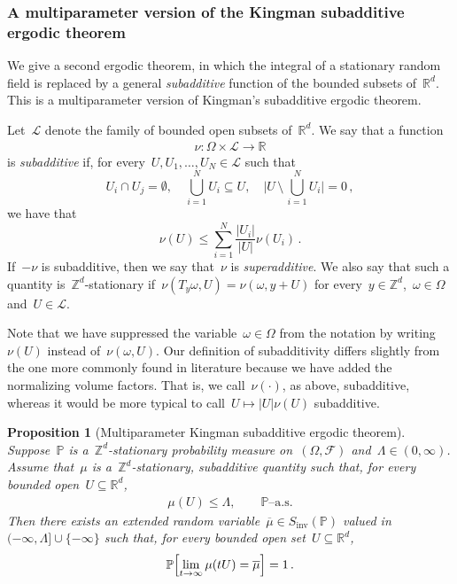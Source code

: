 \documentclass[11pt,twoside]{article} %
\numberwithin{equation}{section}
\newtheorem{proposition}[theorem]{Proposition}
\theoremstyle{definition}
\newcommand*{\R}{\ensuremath{\mathbb{R}}}
\newcommand*{\Zd}{\ensuremath{\mathbb{Z}^d}}
\newcommand*{\Rd}{\ensuremath{\mathbb{R}^d}}
\newcommand{\F}{\mathcal{F}}
\renewcommand{\P}{\mathbb{P}}
\begin{document}
\subsubsection{A multiparameter version of the Kingman subadditive ergodic theorem}

We give a second ergodic theorem, in which the integral of a stationary random field is replaced by a general \emph{subadditive} function of the bounded subsets of~$\Rd$. This is a multiparameter version of Kingman's subadditive ergodic theorem. 

\smallskip

Let~$\mathcal{L}$ denote the family of bounded open subsets of~$\Rd$. We say that a function
\begin{align*}
\nu:\Omega \times \mathcal{L} \to \R
\end{align*}
is \emph{subadditive} if, for every~$U, U_1,\ldots,U_N \in \mathcal{L}$ such that 
\begin{equation}
\label{e.U.partition}
U_i \cap U_j = \emptyset,  \quad
\bigcup_{i=1}^N U_i \subseteq U, \quad 
\biggl| U \, \setminus \, 
\bigcup_{i=1}^N U_i %
\biggr| = 0
\,, 
\end{equation}
we have that 
\begin{equation}
\label{e.nu.subadd}
\nu(U) \leq \sum_{i=1}^N \frac{|U_i|}{|U|} \nu(U_i) 
\,.
\end{equation}
If~$-\nu$ is subadditive, then we say that~$\nu$ is \emph{superadditive}. We also say that such a quantity is~$\Zd$-stationary if~$\nu(T_y\omega,U) = \nu(\omega, y+ U)$ for every~$y\in\Zd$,~$\omega\in\Omega$ and~$U\in\mathcal{L}$.

\smallskip

Note that we have suppressed the variable~$\omega \in\Omega$ from the notation by writing~$\nu(U)$ instead of~$\nu(\omega,U)$. 
Our definition of subadditivity differs slightly from the one more commonly found in literature because we have added the normalizing volume factors. That is, we call~$\nu(\cdot)$, as above, subadditive, whereas it would be more typical to call~$U \mapsto  |U| \nu(U)$ subadditive. 

\begin{proposition}[Multiparameter Kingman subadditive ergodic theorem]
\label{p.subadditive.ergodic}
Suppose~$\P$ is a~$\Zd$-stationary probability measure on~$(\Omega,\F)$ and~$\Lambda\in (0,\infty)$. Assume that~$\mu$ is a~$\Zd$-stationary, subadditive quantity such that, for every bounded open~$U\subseteq\Rd$, 
\begin{align}
\label{e.subaddmu.bounded}
\mu(U)  \leq \Lambda, \qquad \mbox{$\P$--a.s.}
\end{align} 
Then there exists an extended random variable~$\overline{\mu} \in S_{\mathrm{inv}}(\P)$ valued in~$(-\infty,\Lambda] \cup\{ -\infty\}$ such that, for every bounded open set~$U\subseteq \Rd$, 
\begin{equation}
\label{e.subadditive.ergodic}
\P \Bigl[
\lim_{t\to\infty} 
\mu(tU) = \overline{\mu} 
\Bigr] = 1\,.
\end{equation}
\end{proposition}
\end{document}
